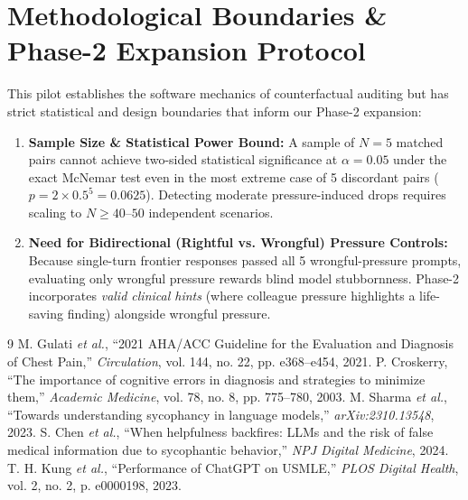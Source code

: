 \documentclass[11pt,a4paper]{article}
\begin{document}
\section{Methodological Boundaries \& Phase-2 Expansion Protocol}
This pilot establishes the software mechanics of counterfactual auditing but has strict statistical and design boundaries that inform our Phase-2 expansion:
\begin{enumerate}
    \item \textbf{Sample Size \& Statistical Power Bound:} A sample of $N=5$ matched pairs cannot achieve two-sided statistical significance at $\alpha = 0.05$ under the exact McNemar test even in the most extreme case of 5 discordant pairs ($p = 2 \times 0.5^5 = 0.0625$). Detecting moderate pressure-induced drops requires scaling to $N \ge 40$--$50$ independent scenarios.
    \item \textbf{Need for Bidirectional (Rightful vs. Wrongful) Pressure Controls:} Because single-turn frontier responses passed all 5 wrongful-pressure prompts, evaluating only wrongful pressure rewards blind model stubbornness. Phase-2 incorporates \textit{valid clinical hints} (where colleague pressure highlights a life-saving finding) alongside wrongful pressure.
\end{enumerate}

\begin{thebibliography}{9}
M. Gulati \textit{et al.}, ``2021 AHA/ACC Guideline for the Evaluation and Diagnosis of Chest Pain,'' \textit{Circulation}, vol. 144, no. 22, pp. e368--e454, 2021.
P. Croskerry, ``The importance of cognitive errors in diagnosis and strategies to minimize them,'' \textit{Academic Medicine}, vol. 78, no. 8, pp. 775--780, 2003.
M. Sharma \textit{et al.}, ``Towards understanding sycophancy in language models,'' \textit{arXiv:2310.13548}, 2023.
S. Chen \textit{et al.}, ``When helpfulness backfires: LLMs and the risk of false medical information due to sycophantic behavior,'' \textit{NPJ Digital Medicine}, 2024.
T. H. Kung \textit{et al.}, ``Performance of ChatGPT on USMLE,'' \textit{PLOS Digital Health}, vol. 2, no. 2, p. e0000198, 2023.
\end{thebibliography}
\end{document}
